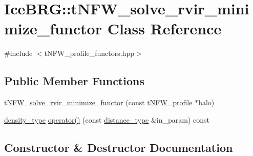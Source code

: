 \hypertarget{classIceBRG_1_1tNFW__solve__rvir__minimize__functor}{}\section{Ice\+B\+R\+G\+:\+:t\+N\+F\+W\+\_\+solve\+\_\+rvir\+\_\+minimize\+\_\+functor Class Reference}
\label{classIceBRG_1_1tNFW__solve__rvir__minimize__functor}


{\ttfamily \#include $<$t\+N\+F\+W\+\_\+profile\+\_\+functors.\+hpp$>$}

\subsection*{Public Member Functions}
\begin{DoxyCompactItemize}
\item 
\hyperlink{classIceBRG_1_1tNFW__solve__rvir__minimize__functor_aac0ec5193898b73a131aabbe7914112c}{t\+N\+F\+W\+\_\+solve\+\_\+rvir\+\_\+minimize\+\_\+functor} (const \hyperlink{classIceBRG_1_1tNFW__profile}{t\+N\+F\+W\+\_\+profile} $\ast$halo)
\item 
\hyperlink{namespaceIceBRG_a9f5e5cdd641bb4c06f7305dfb5ae0238}{density\+\_\+type} \hyperlink{classIceBRG_1_1tNFW__solve__rvir__minimize__functor_abbbe089c877efce1e83c5b7f6924c254}{operator()} (const \hyperlink{namespaceIceBRG_a45499647eb87e24c10ab32c628711cec}{distance\+\_\+type} \&in\+\_\+param) const 
\end{DoxyCompactItemize}


\subsection{Constructor \& Destructor Documentation}
\hypertarget{classIceBRG_1_1tNFW__solve__rvir__minimize__functor_aac0ec5193898b73a131aabbe7914112c}{}
